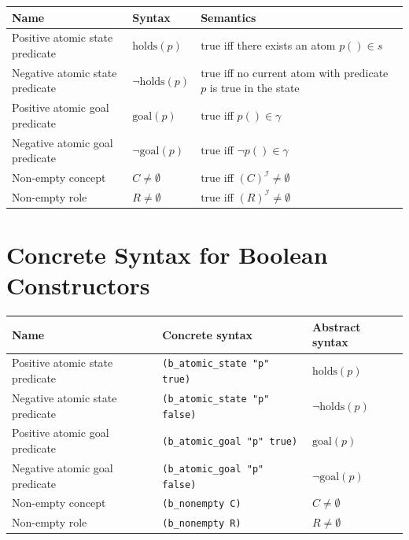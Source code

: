 \documentclass[11pt]{article}
\newcommand{\I}{\mathcal{I}}
\newcommand{\sem}[1]{\left(#1\right)^{\I}}
\newenvironment{compacttable}
  {\begingroup\setlength{\tabcolsep}{3pt}}
  {\endgroup}
\begin{document}
\begin{compacttable}
\begin{longtable}{>{\raggedright\arraybackslash}p{}
                  >{\centering\arraybackslash}p{}
                  >{\raggedright\arraybackslash}p{}}
\toprule
Name & Syntax & Semantics \\
\midrule
\endhead

Positive atomic state predicate &
$\mathrm{holds}(p)$ &
$\mathrm{true}$ iff there exists an atom $p() \in s$ \\

Negative atomic state predicate &
$\neg\mathrm{holds}(p)$ &
$\mathrm{true}$ iff no current atom with predicate $p$ is true in the state \\

Positive atomic goal predicate &
$\mathrm{goal}(p)$ &
$\mathrm{true}$ iff $p() \in \gamma$ \\

Negative atomic goal predicate &
$\neg\mathrm{goal}(p)$ &
$\mathrm{true}$ iff $\neg p() \in \gamma$ \\

Non-empty concept &
$C \neq \emptyset$ &
$\mathrm{true}$ iff $\sem{C} \neq \emptyset$ \\

Non-empty role &
$R \neq \emptyset$ &
$\mathrm{true}$ iff $\sem{R} \neq \emptyset$ \\

\bottomrule
\end{longtable}
\end{compacttable}

\section{Concrete Syntax for Boolean Constructors}

\begin{compacttable}
\begin{longtable}{>{\raggedright\arraybackslash}p{}
                  >{\raggedright\arraybackslash}p{}
                  >{\raggedright\arraybackslash}p{}}
\toprule
Name & Concrete syntax & Abstract syntax \\
\midrule
\endhead
Positive atomic state predicate & \texttt{(b\_atomic\_state "p" true)} & $\mathrm{holds}(p)$ \\
Negative atomic state predicate & \texttt{(b\_atomic\_state "p" false)} & $\neg\mathrm{holds}(p)$ \\
Positive atomic goal predicate & \texttt{(b\_atomic\_goal "p" true)} & $\mathrm{goal}(p)$ \\
Negative atomic goal predicate & \texttt{(b\_atomic\_goal "p" false)} & $\neg\mathrm{goal}(p)$ \\
Non-empty concept & \texttt{(b\_nonempty C)} & $C \neq \emptyset$ \\
Non-empty role & \texttt{(b\_nonempty R)} & $R \neq \emptyset$ \\
\bottomrule
\end{longtable}
\end{compacttable}
\end{document}
